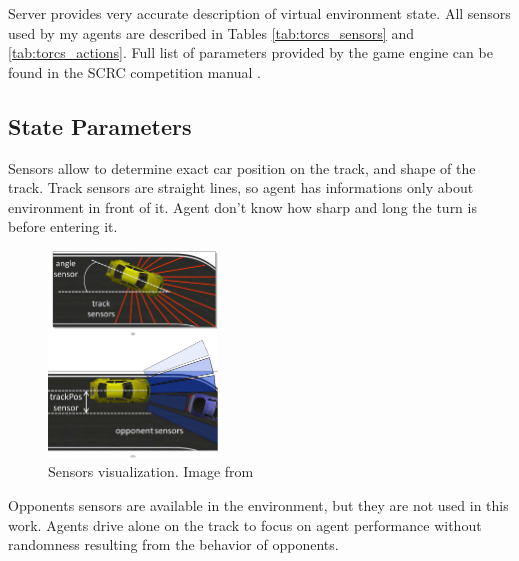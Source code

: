 \documentclass[declaration,shortabstract,english,inz]{iithesis}
\begin{document}
Server provides very accurate description of virtual environment state.
All sensors used by my agents are described in Tables \ref{tab:torcs_sensors} and \ref{tab:torcs_actions}.
Full list of parameters provided by the game engine can be found in the SCRC competition manual \cite{scrc_manual}.

\subsection{State Parameters}

Sensors allow to determine exact car position on the track, and shape of the track.
Track sensors are straight lines, so agent has informations only about environment in front of it.
Agent don't know how sharp and long the turn is before entering it.

\begin{figure}[h]
    \centering
    \includegraphics[width=0.4\textwidth]{img/sensors.png}
    \caption{Sensors visualization. Image from \cite{SCRC}}
    \label{fig:sensors_img}
\end{figure}


Opponents sensors are available in the environment, but they are not used in this work. Agents drive alone on the track to focus on agent performance without randomness resulting from the behavior of opponents.
\end{document}
